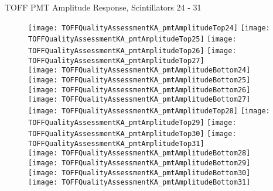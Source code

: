 \documentclass[11pt]{beamer}
\begin{document}
\begin{frame}{TOFF PMT Amplitude Response, Scintillators 24 - 31}
\begin{figure}
\centering
\texttt{[image: TOFFQualityAssessmentKA\_pmtAmplitudeTop24]}
\texttt{[image: TOFFQualityAssessmentKA\_pmtAmplitudeTop25]}
\texttt{[image: TOFFQualityAssessmentKA\_pmtAmplitudeTop26]}
\texttt{[image: TOFFQualityAssessmentKA\_pmtAmplitudeTop27]} \\ 
\texttt{[image: TOFFQualityAssessmentKA\_pmtAmplitudeBottom24]}
\texttt{[image: TOFFQualityAssessmentKA\_pmtAmplitudeBottom25]}
\texttt{[image: TOFFQualityAssessmentKA\_pmtAmplitudeBottom26]}
\texttt{[image: TOFFQualityAssessmentKA\_pmtAmplitudeBottom27]} \\
\texttt{[image: TOFFQualityAssessmentKA\_pmtAmplitudeTop28]}
\texttt{[image: TOFFQualityAssessmentKA\_pmtAmplitudeTop29]}
\texttt{[image: TOFFQualityAssessmentKA\_pmtAmplitudeTop30]}
\texttt{[image: TOFFQualityAssessmentKA\_pmtAmplitudeTop31]} \\
\texttt{[image: TOFFQualityAssessmentKA\_pmtAmplitudeBottom28]}
\texttt{[image: TOFFQualityAssessmentKA\_pmtAmplitudeBottom29]}
\texttt{[image: TOFFQualityAssessmentKA\_pmtAmplitudeBottom30]}
\texttt{[image: TOFFQualityAssessmentKA\_pmtAmplitudeBottom31]} \\
\end{figure}
\end{frame}
\end{document}
